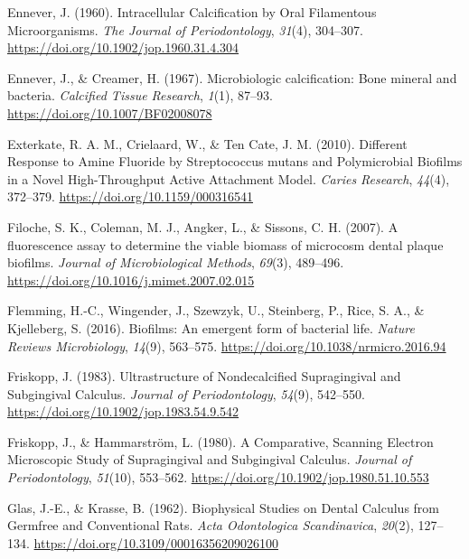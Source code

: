 \documentclass[
  b5paper,
]{book}
\newlength{\cslhangindent}
\newenvironment{CSLReferences}[2] %
 {\begin{list}{}{%
  \setlength{\itemindent}{0pt}
  \setlength{\leftmargin}{0pt}
  \setlength{\parsep}{0pt}
  \ifodd #1
   \setlength{\leftmargin}{\cslhangindent}
   \setlength{\itemindent}{-1\cslhangindent}
  \fi
  \setlength{\itemsep}{#2\baselineskip}}}
 {\end{list}}
\begin{document}
\begin{CSLReferences}{1}{0}
Ennever, J. (1960). Intracellular {Calcification} by {Oral Filamentous
Microorganisms}. \emph{The Journal of Periodontology}, \emph{31}(4),
304--307. \url{https://doi.org/10.1902/jop.1960.31.4.304}

Ennever, J., \& Creamer, H. (1967). Microbiologic calcification: {Bone}
mineral and bacteria. \emph{Calcified Tissue Research}, \emph{1}(1),
87--93. \url{https://doi.org/10.1007/BF02008078}

Exterkate, R. A. M., Crielaard, W., \& Ten Cate, J. M. (2010). Different
{Response} to {Amine Fluoride} by {Streptococcus} mutans and
{Polymicrobial Biofilms} in a {Novel High-Throughput Active Attachment
Model}. \emph{Caries Research}, \emph{44}(4), 372--379.
\url{https://doi.org/10.1159/000316541}

Filoche, S. K., Coleman, M. J., Angker, L., \& Sissons, C. H. (2007). A
fluorescence assay to determine the viable biomass of microcosm dental
plaque biofilms. \emph{Journal of Microbiological Methods},
\emph{69}(3), 489--496.
\url{https://doi.org/10.1016/j.mimet.2007.02.015}

Flemming, H.-C., Wingender, J., Szewzyk, U., Steinberg, P., Rice, S. A.,
\& Kjelleberg, S. (2016). Biofilms: An emergent form of bacterial life.
\emph{Nature Reviews Microbiology}, \emph{14}(9), 563--575.
\url{https://doi.org/10.1038/nrmicro.2016.94}

Friskopp, J. (1983). Ultrastructure of {Nondecalcified Supragingival}
and {Subgingival Calculus}. \emph{Journal of Periodontology},
\emph{54}(9), 542--550. \url{https://doi.org/10.1902/jop.1983.54.9.542}

Friskopp, J., \& Hammarström, L. (1980). A {Comparative}, {Scanning
Electron Microscopic Study} of {Supragingival} and {Subgingival
Calculus}. \emph{Journal of Periodontology}, \emph{51}(10), 553--562.
\url{https://doi.org/10.1902/jop.1980.51.10.553}

Glas, J.-E., \& Krasse, B. (1962). Biophysical {Studies} on {Dental
Calculus} from {Germfree} and {Conventional Rats}. \emph{Acta
Odontologica Scandinavica}, \emph{20}(2), 127--134.
\url{https://doi.org/10.3109/00016356209026100}


\end{CSLReferences}
\end{document}
